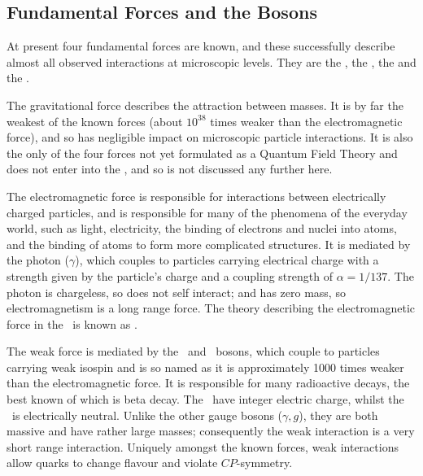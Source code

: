\subsection{Fundamental Forces and the Bosons}

At present four fundamental forces are known, and these successfully describe
almost all observed interactions at microscopic levels. They are the
, the , the  
and the . 

The gravitational force describes the attraction
between masses. It is by far the
weakest of the known forces (about $10^{38}$ times weaker than the electromagnetic
force), and so has negligible impact on microscopic particle interactions. It is
also the only of the four forces not yet formulated as a Quantum Field
Theory and does not enter into the \sm, and so is not discussed any further here.

The electromagnetic force is responsible for interactions between electrically
charged particles, and is responsible for many of the phenomena of the everyday
world, such as light, electricity, the binding of electrons and nuclei into
atoms, and the binding of
atoms to form more complicated structures. 
It is mediated by the photon ($\gamma$), which couples to
particles carrying electrical charge with a strength given by the particle's
charge and a coupling strength of $\alpha=1/137$. The photon is chargeless, so
does not self interact; and has zero
mass, so electromagnetism is a long range force. The theory describing the electromagnetic force in the \sm\ is known
as .

The weak force is mediated by the \Wpm\ and \Z\ bosons, which couple to particles
carrying weak isospin and is so named as it is approximately 1000 times weaker
than the electromagnetic force. 
It is responsible for many radioactive decays, the best known of which is beta decay.
 The \Wpm\ have integer electric
charge, whilst the \Z\ is electrically neutral. Unlike the other gauge bosons
($\gamma,g$), they are both massive and have rather large masses; consequently the weak
interaction is a very short range interaction.  Uniquely amongst
the known forces, weak interactions allow quarks to change flavour and violate
$CP$-symmetry.

